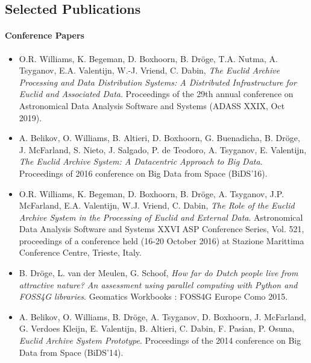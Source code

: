 \subsection*{Selected Publications}

\paragraph{Conference Papers}

\begin{itemize}

\item[] O.R. Williams, K. Begeman, D. Boxhoorn, B. Dröge, T.A. Nutma, A. Tsyganov, E.A. Valentijn, W.-J. Vriend, C. Dabin,
\emph{The Euclid Archive Processing and Data Distribution Systems: A Distributed Infrastructure for Euclid and Associated Data}.
Proceedings of the 29th annual conference on Astronomical Data Analysis Software and Systems (ADASS XXIX, Oct 2019).

\item[] A. Belikov, O. Williams, B. Altieri, D. Boxhoorn, G. Buenadicha, B. Dröge, J. McFarland, S. Nieto, J. Salgado, P. de Teodoro, A. Tsyganov, E. Valentijn,
\emph{The Euclid Archive System: A Datacentric Approach to Big Data}.
Proceedings of 2016 conference on Big Data from Space (BiDS'16).

\item[] O.R. Williams, K. Begeman, D. Boxhoorn, B. Dröge, A. Tsyganov, J.P. McFarland, E.A. Valentijn, W.J. Vriend, C. Dabin,
\emph{The Role of the Euclid Archive System in the Processing of Euclid and External Data}.
Astronomical Data Analysis Software and Systems XXVI ASP Conference Series, Vol. 521, proceedings of a conference held (16-20 October 2016) at Stazione Marittima Conference Centre, Trieste, Italy.

\item[] B. Dröge, L. van der Meulen, G. Schoof,
\emph{How far do Dutch people live from attractive nature? An assessment using parallel computing with Python and FOSS4G libraries}.
Geomatics Workbooks : FOSS4G Europe Como 2015.

\item[] A. Belikov, O. Williams, B. Dröge, A. Tsyganov, D. Boxhoorn, J. McFarland, G. Verdoes Kleijn, E. Valentijn, B. Altieri, C. Dabin, F. Pasian, P. Osuna,
\emph{Euclid Archive System Prototype}.
Proceedings of the 2014 conference on Big Data from Space (BiDS’14).

\end{itemize}

